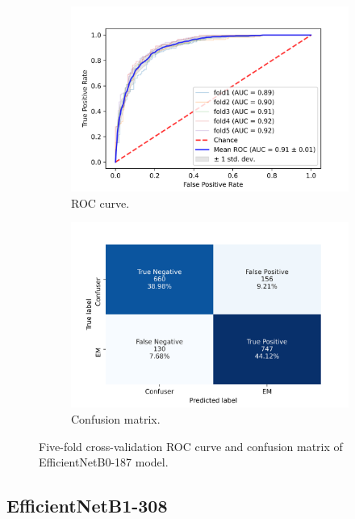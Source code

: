 \begin{figure}[h!]
	\centering
	\begin{subfigure}[b]{0.49\textwidth}
		\centering
		\includegraphics[width=\textwidth,keepaspectratio]{images/Supplement4/image169.png}
		\caption{ROC curve.}
	\end{subfigure}
	\hfill
	\begin{subfigure}[b]{0.49\textwidth}
		\centering
		\includegraphics[width=\textwidth,keepaspectratio]{images/Supplement4/image174.png}
		\caption{Confusion matrix.}
	\end{subfigure}
	\caption{Five-fold cross-validation ROC curve and confusion matrix of EfficientNetB0-187 model.}
\end{figure}

\vfill\clearpage
\subsection{EfficientNetB1-308}

